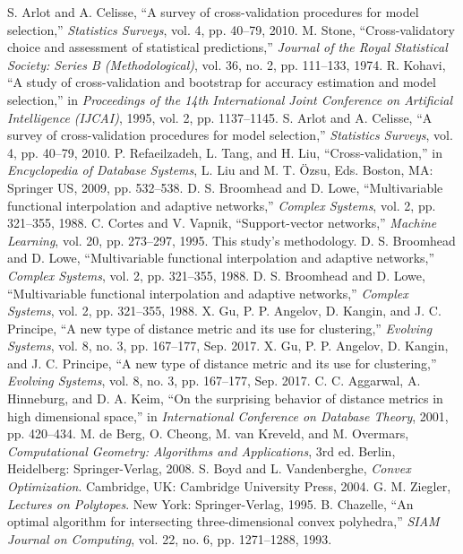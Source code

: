 \documentclass[conference]{IEEEtran}
\begin{document}
\begin{thebibliography}{99}
 S. Arlot and A. Celisse, “A survey of cross-validation procedures for model selection,” \textit{Statistics Surveys}, vol. 4, pp. 40–79, 2010.
 M. Stone, “Cross-validatory choice and assessment of statistical predictions,” \textit{Journal of the Royal Statistical Society: Series B (Methodological)}, vol. 36, no. 2, pp. 111–133, 1974.
 R. Kohavi, “A study of cross-validation and bootstrap for accuracy estimation and model selection,” in \textit{Proceedings of the 14th International Joint Conference on Artificial Intelligence (IJCAI)}, 1995, vol. 2, pp. 1137–1145.
 S. Arlot and A. Celisse, “A survey of cross-validation procedures for model selection,” \textit{Statistics Surveys}, vol. 4, pp. 40–79, 2010.
 P. Refaeilzadeh, L. Tang, and H. Liu, “Cross-validation,” in \textit{Encyclopedia of Database Systems}, L. Liu and M. T. Özsu, Eds. Boston, MA: Springer US, 2009, pp. 532–538.
 D. S. Broomhead and D. Lowe, “Multivariable functional interpolation and adaptive networks,” \textit{Complex Systems}, vol. 2, pp. 321–355, 1988.
 C. Cortes and V. Vapnik, “Support-vector networks,” \textit{Machine Learning}, vol. 20, pp. 273–297, 1995.
 This study's methodology.
 D. S. Broomhead and D. Lowe, “Multivariable functional interpolation and adaptive networks,” \textit{Complex Systems}, vol. 2, pp. 321–355, 1988.
 D. S. Broomhead and D. Lowe, “Multivariable functional interpolation and adaptive networks,” \textit{Complex Systems}, vol. 2, pp. 321–355, 1988.
 X. Gu, P. P. Angelov, D. Kangin, and J. C. Principe, “A new type of distance metric and its use for clustering,” \textit{Evolving Systems}, vol. 8, no. 3, pp. 167–177, Sep. 2017.
 X. Gu, P. P. Angelov, D. Kangin, and J. C. Principe, “A new type of distance metric and its use for clustering,” \textit{Evolving Systems}, vol. 8, no. 3, pp. 167–177, Sep. 2017.
 C. C. Aggarwal, A. Hinneburg, and D. A. Keim, “On the surprising behavior of distance metrics in high dimensional space,” in \textit{International Conference on Database Theory}, 2001, pp. 420–434.
 M. de Berg, O. Cheong, M. van Kreveld, and M. Overmars, \textit{Computational Geometry: Algorithms and Applications}, 3rd ed. Berlin, Heidelberg: Springer-Verlag, 2008.
 S. Boyd and L. Vandenberghe, \textit{Convex Optimization}. Cambridge, UK: Cambridge University Press, 2004.
 G. M. Ziegler, \textit{Lectures on Polytopes}. New York: Springer-Verlag, 1995.
 B. Chazelle, “An optimal algorithm for intersecting three-dimensional convex polyhedra,” \textit{SIAM Journal on Computing}, vol. 22, no. 6, pp. 1271–1288, 1993.

\end{thebibliography}
\end{document}
